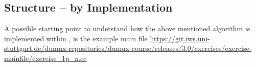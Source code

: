 \subsection{Structure -- by Implementation}
A possible starting point to understand how the above mentioned algorithm is implemented within \Dumux,
is the example main file
\url{https://git.iws.uni-stuttgart.de/dumux-repositories/dumux-course/releases/3.0/exercises/exercise-mainfile/exercise_1p_a.cc}
